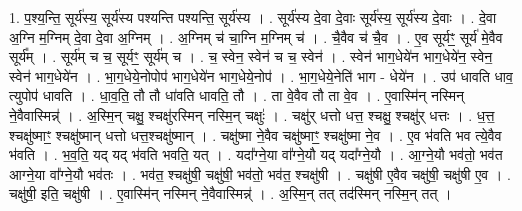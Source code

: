 \documentclass[17pt]{extarticle}
\begin{document}
1. प॒श्य॒न्ति॒ सूर्य॑स्य॒ सूर्य॑स्य पश्यन्ति पश्यन्ति॒ सूर्य॑स्य । . सूर्य॑स्य दे॒वा दे॒वाः सूर्य॑स्य॒ सूर्य॑स्य दे॒वाः । . दे॒वा अ॒ग्नि म॒ग्निम् दे॒वा दे॒वा अ॒ग्निम् । . अ॒ग्निम् च॑ चा॒ग्नि म॒ग्निम् च॑ । . चै॒वैव च॑ चै॒व । . ए॒व सूर्यꣳ॒॒ सूर्य॑ मे॒वैव सूर्य᳚म् । . सूर्य॑म् च च॒ सूर्यꣳ॒॒ सूर्य॑म् च । . च॒ स्वेन॒ स्वेन॑ च च॒ स्वेन॑ । . स्वेन॑ भाग॒धेये॑न भाग॒धेये॑न॒ स्वेन॒ स्वेन॑ भाग॒धेये॑न । . भा॒ग॒धेये॒नोपोप॑ भाग॒धेये॑न भाग॒धेये॒नोप॑ । . भा॒ग॒धेये॒नेति॑ भाग - धेये॑न । . उप॑ धावति धाव॒ त्युपोप॑ धावति । . धा॒व॒ति॒ तौ तौ धा॑वति धावति॒ तौ । . ता वे॒वैव तौ ता वे॒व । . ए॒वास्मि॑न् नस्मिन् ने॒वैवास्मिन्न्॑ । . अ॒स्मि॒न् चक्षु॒ श्चक्षु॑रस्मिन् नस्मि॒न् चक्षुः॑ । . चक्षु॑र् धत्तो धत्त॒ श्चक्षु॒ श्चक्षु॑र् धत्तः । . ध॒त्त॒ श्चक्षु॑ष्माꣳ॒॒ श्चक्षु॑ष्मान् धत्तो धत्त॒श्चक्षु॑ष्मान् । . चक्षु॑ष्मा ने॒वैव चक्षु॑ष्माꣳ॒॒ श्चक्षु॑ष्मा ने॒व । . ए॒व भ॑वति भव त्ये॒वैव भ॑वति । . भ॒व॒ति॒ यद् यद् भ॑वति भवति॒ यत् । . यदा᳚ग्ने॒या वा᳚ग्ने॒यौ यद् यदा᳚ग्ने॒यौ । . आ॒ग्ने॒यौ भव॑तो॒ भव॑त आग्ने॒या वा᳚ग्ने॒यौ भव॑तः । . भव॑त॒ श्चक्षु॑षी॒ चक्षु॑षी॒ भव॑तो॒ भव॑त॒ श्चक्षु॑षी । . चक्षु॑षी ए॒वैव चक्षु॑षी॒ चक्षु॑षी ए॒व । . चक्षु॑षी॒ इति॒ चक्षु॑षी । . ए॒वास्मि॑न् नस्मिन् ने॒वैवास्मिन्न्॑ । . अ॒स्मि॒न् तत् तद॑स्मिन् नस्मि॒न् तत् । \newline
\end{document}
